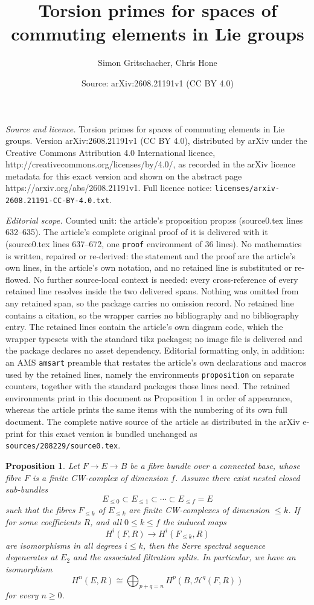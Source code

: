 \documentclass[10pt,a4paper]{amsart}
\title{Torsion primes for spaces of commuting elements in Lie groups}
\author{Simon Gritschacher, Chris Hone}
\date{Source: arXiv:2608.21191v1 (CC BY 4.0)}
\newtheorem{proposition}{Proposition}
\begin{document}
\maketitle

\noindent\emph{Source and licence.} Torsion primes for spaces of commuting elements in Lie groups. Version arXiv:2608.21191v1 (CC BY 4.0), distributed by arXiv under the Creative Commons Attribution 4.0 International licence, http://creativecommons.org/licenses/by/4.0/, as recorded in the arXiv licence metadata for this exact version and shown on the abstract page https://arxiv.org/abs/2608.21191v1. Full licence notice: \texttt{licenses/arxiv-2608.21191-CC-BY-4.0.txt}.\par\smallskip

\noindent\textit{Editorial scope.} Counted unit: the article's proposition prop:ss (source0.tex lines 632--635). The article's complete original proof of it is delivered with it (source0.tex lines 637--672, one \texttt{proof} environment of 36 lines). No mathematics is written, repaired or re-derived: the statement and the proof are the article's own lines, in the article's own notation, and no retained line is substituted or re-flowed.  No further source-local context is needed: every cross-reference of every retained line resolves inside the two delivered spans.  Nothing was omitted from any retained span, so the package carries no omission record.  No retained line contains a citation, so the wrapper carries no bibliography and no bibliography entry.  The retained lines contain the article's own diagram code, which the wrapper typesets with the standard tikz packages; no image file is delivered and the package declares no asset dependency.  Editorial formatting only, in addition: an AMS \texttt{amsart} preamble that restates the article's own declarations and macros used by the retained lines, namely the environments \texttt{proposition} on separate counters, together with the standard packages those lines need.  The retained environments print in this document as Proposition 1 in order of appearance, whereas the article prints the same items with the numbering of its own full document.  The complete native source of the article as distributed in the arXiv e-print for this exact version is bundled unchanged as \texttt{sources/208229/source0.tex}.
\begin{proposition} \label{prop:ss}
Let $F\to E\to B$ be a fibre bundle over a connected base, whose fibre $F$ is a finite CW-complex of dimension $f$. Assume there exist nested closed sub-bundles \[E_{\leq 0}\subset E_{\leq 1}\subset \cdots \subset E_{\leq f}=E\] such that the fibres $F_{\leq k}$ of $E_{\leq k}$ are finite CW-complexes of dimension $\leq k$. If for some coefficients $R$, and all $0\leq k\leq f$ the induced maps\[H^i(F,R)\to H^i(F_{\leq k},R)\] are isomorphisms in all degrees $i \leq k$, then the Serre spectral sequence degenerates at $E_2$ and the associated filtration splits. In particular, we have an isomorphism\[H^n(E,R)\cong \bigoplus_{p+q=n} H^p(B,\mathcal{H}^q(F,R))\]
for every $n\geq 0$.
\end{proposition}
\end{document}
